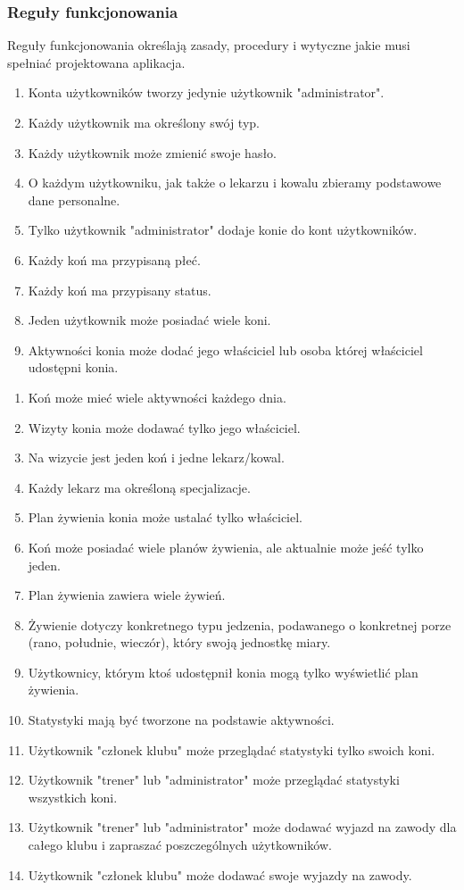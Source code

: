 \documentclass[12pt,oneside]{report}
\begin{document}
\subsubsection{Reguły funkcjonowania}
Reguły funkcjonowania określają zasady, procedury i wytyczne jakie musi spełniać projektowana aplikacja. 
\begin{enumerate}[start=1,label={\bfseries REG\textbackslash 00\arabic*}]
	\item Konta użytkowników tworzy jedynie użytkownik "administrator".
	\item Każdy użytkownik ma określony swój typ.
	\item Każdy użytkownik może zmienić swoje hasło.
	\item O każdym użytkowniku, jak także o lekarzu i kowalu zbieramy podstawowe dane personalne.
	\item Tylko użytkownik "administrator" dodaje konie do kont użytkowników.
	\item Każdy koń ma przypisaną płeć.
	\item Każdy koń ma przypisany status.
	\item Jeden użytkownik może posiadać wiele koni.
	\item Aktywności konia może dodać jego właściciel lub osoba której właściciel udostępni konia.
\end{enumerate}
\begin{enumerate}[start=10,label={\bfseries REG\textbackslash 0\arabic*}]
	\item Koń może mieć wiele aktywności każdego dnia.
	\item Wizyty konia może dodawać tylko jego właściciel.
	\item Na wizycie jest jeden koń i jedne lekarz/kowal.
	\item Każdy lekarz ma określoną specjalizacje.
	\item Plan żywienia konia może ustalać tylko właściciel. 
	\item Koń może posiadać wiele planów żywienia, ale aktualnie może jeść tylko jeden.
	\item Plan żywienia zawiera wiele żywień.
	\item Żywienie dotyczy konkretnego typu jedzenia, podawanego o konkretnej porze (rano, południe, wieczór), który swoją jednostkę miary.
	\item Użytkownicy, którym ktoś udostępnił konia mogą tylko wyświetlić plan żywienia.
	\item Statystyki mają być tworzone na podstawie aktywności.
	\item Użytkownik "członek klubu" może przeglądać statystyki tylko swoich koni.
	\item Użytkownik "trener" lub "administrator" może przeglądać statystyki wszystkich koni.
	\item Użytkownik "trener" lub "administrator" może dodawać wyjazd na zawody dla całego klubu i zapraszać poszczególnych użytkowników.
	\item Użytkownik "członek klubu" może dodawać swoje wyjazdy na zawody.
\end{enumerate}
\end{document}
